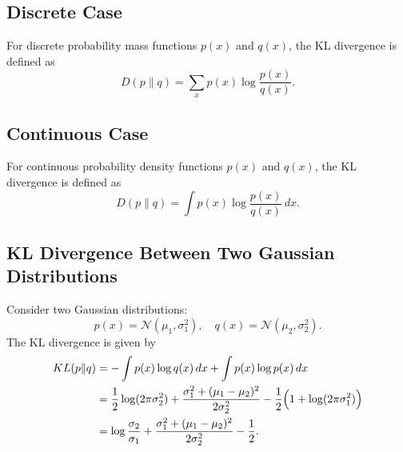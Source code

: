 \documentclass[12pt,a4paper]{report}
\begin{document}
\subsection*{Discrete Case}
For discrete probability mass functions \(p(x)\) and \(q(x)\), the KL divergence is defined as
\[
D(p\|q)= \sum_{x} p(x) \log \frac{p(x)}{q(x)}.
\]

\subsection*{Continuous Case}
For continuous probability density functions \(p(x)\) and \(q(x)\), the KL divergence is defined as
\[
D(p\|q)= \int p(x) \log \frac{p(x)}{q(x)}\, dx.
\]

\subsection*{KL Divergence Between Two Gaussian Distributions}
Consider two Gaussian distributions:
\[
p(x) = \mathcal{N}(\mu_1,\sigma_1^2), \quad q(x) = \mathcal{N}(\mu_2,\sigma_2^2).
\]
The KL divergence is given by
\[
\begin{aligned}
KL(p\|q) &= -\int p(x)\log q(x)\,dx + \int p(x)\log p(x)\,dx \\
&= \frac{1}{2}\log (2\pi\sigma_2^2) + \frac{\sigma_1^2+(\mu_1-\mu_2)^2}{2\sigma_2^2} - \frac{1}{2}\Bigl(1+\log(2\pi\sigma_1^2)\Bigr) \\
&= \log \frac{\sigma_2}{\sigma_1} + \frac{\sigma_1^2+(\mu_1-\mu_2)^2}{2\sigma_2^2} - \frac{1}{2}.
\end{aligned}
\]
\end{document}
